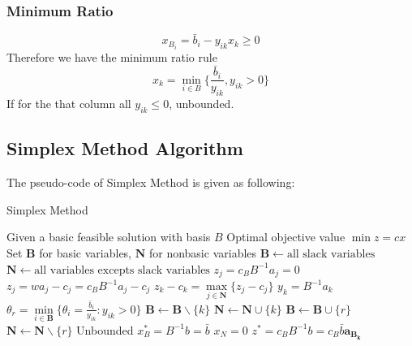  				\subsubsection{Minimum Ratio}
 					\begin{equation}
 						x_{B_i} = \bar{b}_i - y_{ik}x_k \ge 0 
 					\end{equation}
 					Therefore we have the minimum ratio rule
 					\begin{equation}
 						x_k = \min_{i \in B} \{\frac{\bar{b}_i}{y_{ik}}, y_{ik} > 0\} 
 					\end{equation}
 					If for the that column all $y_{ik} \le 0$, unbounded.

			\subsection{Simplex Method Algorithm}
				The pseudo-code of Simplex Method is given as following:
				\begin{algorithm}[h!]
					\caption{Simplex Method}
					\begin{algorithmic}[1]
						\REQUIRE Given a basic feasible solution with basis $B$
						\ENSURE Optimal objective value $\min z= cx$
						\STATE Set $\mathbf{B}$ for basic variables, $\mathbf{N}$ for nonbasic variables
						\STATE $\mathbf{B} \gets \text{all slack variables}$
						\STATE $\mathbf{N} \gets \text{all variables excepts slack variables}$
							\STATE $z_j=c_BB^{-1}a_j=0$				
						\ENDFOR
							\STATE $z_j=wa_j-c_j=c_BB^{-1}a_j-c_j$
							\STATE $z_k-c_k=\max\limits_{j \in \mathbf{N}}\{z_j-c_j\}$
							\STATE $y_k=B^{-1}a_k$
								\STATE $\theta_r=\min\limits_{i \in \mathbf{B}}\{\theta_i=\frac{\bar{b}_i}{y_{ik}}:y_{ik}>0\}$
								\STATE $\mathbf{B} \gets \mathbf{B} \backslash \{k\}$
								\STATE $\mathbf{N} \gets \mathbf{N} \cup \{k\}$
								\STATE $\mathbf{B} \gets \mathbf{B} \cup \{r\}$
								\STATE $\mathbf{N} \gets \mathbf{N} \backslash \{r\}$
							\ELSE
								\STATE Unbounded
							\ENDIF
						\ENDWHILE
						\STATE $x_B^*=B^{-1}b=\bar{b}$
						\STATE $x_N=0$
						\STATE $z^*=c_BB^{-1}b=c_B\bar{b}\mathbf{a_{B_k}}$
					\end{algorithmic}
				\end{algorithm}

